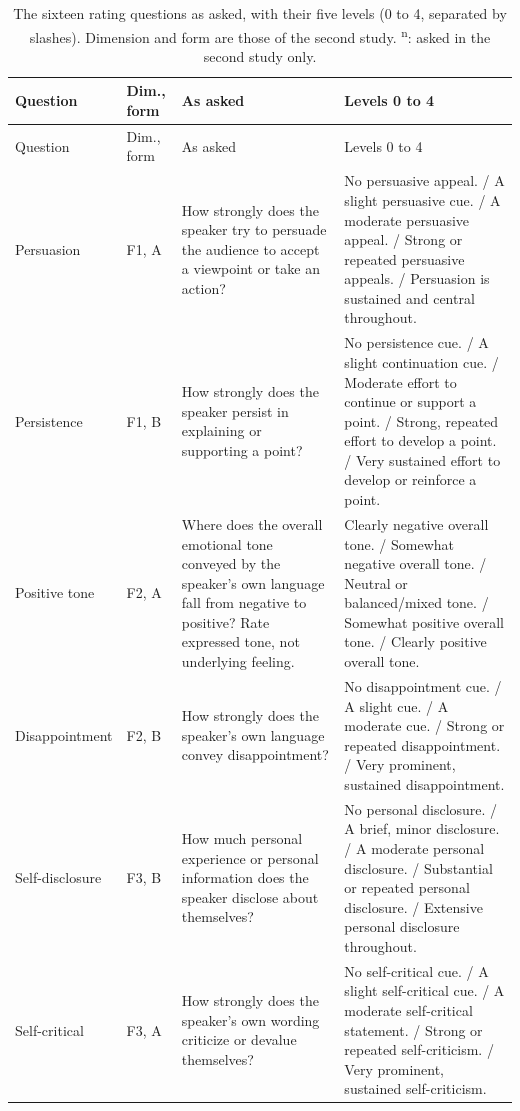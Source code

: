 \scriptsize
\begin{longtable}{@{}p{2.2cm}p{1.0cm}p{4.7cm}p{7.0cm}@{}}
\caption{The sixteen rating questions as asked, with their five levels (0 to 4, separated by slashes). Dimension and form are those of the second study. \textsuperscript{n}: asked in the second study only.}\label{tab:wording}\\
\toprule
Question & Dim., form & As asked & Levels 0 to 4 \\
\midrule
\endfirsthead
\toprule
Question & Dim., form & As asked & Levels 0 to 4 \\
\midrule
\endhead
\bottomrule
\endfoot
Persuasion & F1, A & How strongly does the speaker try to persuade the audience to accept a viewpoint or take an action? & No persuasive appeal. / A slight persuasive cue. / A moderate persuasive appeal. / Strong or repeated persuasive appeals. / Persuasion is sustained and central throughout. \\
\addlinespace[2pt]
Persistence & F1, B & How strongly does the speaker persist in explaining or supporting a point? & No persistence cue. / A slight continuation cue. / Moderate effort to continue or support a point. / Strong, repeated effort to develop a point. / Very sustained effort to develop or reinforce a point. \\
\addlinespace[2pt]
Positive tone & F2, A & Where does the overall emotional tone conveyed by the speaker's own language fall from negative to positive? Rate expressed tone, not underlying feeling. & Clearly negative overall tone. / Somewhat negative overall tone. / Neutral or balanced/mixed tone. / Somewhat positive overall tone. / Clearly positive overall tone. \\
\addlinespace[2pt]
Disappointment & F2, B & How strongly does the speaker's own language convey disappointment? & No disappointment cue. / A slight cue. / A moderate cue. / Strong or repeated disappointment. / Very prominent, sustained disappointment. \\
\addlinespace[2pt]
Self-disclosure & F3, B & How much personal experience or personal information does the speaker disclose about themselves? & No personal disclosure. / A brief, minor disclosure. / A moderate personal disclosure. / Substantial or repeated personal disclosure. / Extensive personal disclosure throughout. \\
\addlinespace[2pt]
Self-critical & F3, A & How strongly does the speaker's own wording criticize or devalue themselves? & No self-critical cue. / A slight self-critical cue. / A moderate self-critical statement. / Strong or repeated self-criticism. / Very prominent, sustained self-criticism. \\

\end{longtable}
